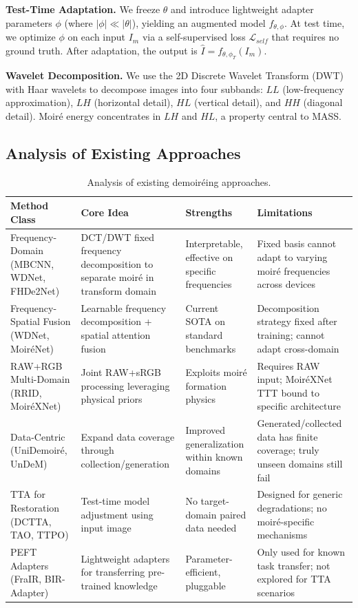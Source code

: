 \documentclass[10pt,twocolumn,letterpaper]{article}
\begin{document}
\textbf{Test-Time Adaptation.} We freeze $\theta$ and introduce lightweight adapter parameters $\phi$ (where $|\phi| \ll |\theta|$), yielding an augmented model $f_{\theta,\phi}$. At test time, we optimize $\phi$ on each input $I_m$ via a self-supervised loss $\mathcal{L}_{self}$ that requires no ground truth. After adaptation, the output is $\hat{I} = f_{\theta,\phi_T}(I_m)$.

\textbf{Wavelet Decomposition.} We use the 2D Discrete Wavelet Transform (DWT) with Haar wavelets to decompose images into four subbands: $LL$ (low-frequency approximation), $LH$ (horizontal detail), $HL$ (vertical detail), and $HH$ (diagonal detail). Moir\'{e} energy concentrates in $LH$ and $HL$, a property central to MASS.

\subsection{Analysis of Existing Approaches}

\begin{table}[t]
\centering
\footnotesize
\caption{Analysis of existing demoir\'{e}ing approaches.}
\label{tab:analysis}
\setlength{\tabcolsep}{3pt}
\begin{tabular}{@{}p{2.2cm}p{3.0cm}p{2.6cm}p{3.2cm}@{}}
\toprule
Method Class & Core Idea & Strengths & Limitations \\
\midrule
Frequency-Domain (MBCNN, WDNet, FHDe2Net) & DCT/DWT fixed frequency decomposition to separate moir\'{e} in transform domain & Interpretable, effective on specific frequencies & Fixed basis cannot adapt to varying moir\'{e} frequencies across devices \\
Frequency-Spatial Fusion (WDNet, Moir\'{e}Net) & Learnable frequency decomposition + spatial attention fusion & Current SOTA on standard benchmarks & Decomposition strategy fixed after training; cannot adapt cross-domain \\
RAW+RGB Multi-Domain (RRID, Moir\'{e}XNet) & Joint RAW+sRGB processing leveraging physical priors & Exploits moir\'{e} formation physics & Requires RAW input; Moir\'{e}XNet TTT bound to specific architecture \\
Data-Centric (UniDemoir\'{e}, UnDeM) & Expand data coverage through collection/generation & Improved generalization within known domains & Generated/collected data has finite coverage; truly unseen domains still fail \\
TTA for Restoration (DCTTA, TAO, TTPO) & Test-time model adjustment using input image & No target-domain paired data needed & Designed for generic degradations; no moir\'{e}-specific mechanisms \\
PEFT Adapters (FraIR, BIR-Adapter) & Lightweight adapters for transferring pre-trained knowledge & Parameter-efficient, pluggable & Only used for known task transfer; not explored for TTA scenarios \\
\bottomrule
\end{tabular}
\end{table}
\end{document}
